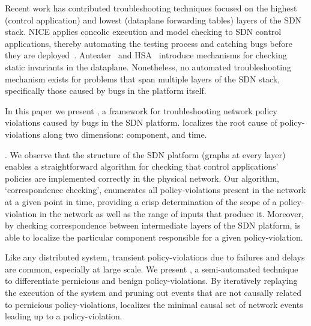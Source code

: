 Recent work has contributed troubleshooting techniques focused on the highest (control
application) and lowest (dataplane forwarding tables) layers of the SDN stack.
NICE applies concolic execution and model checking to SDN control
applications, thereby automating the testing process and catching bugs before
they are deployed~\cite{nice}. Anteater~\cite{anteater} and HSA~\cite{hsa}
introduce mechanisms for checking static invariants in the dataplane.
Nonetheless, no automated troubleshooting mechanism exists for problems that span
multiple layers of the SDN stack, specifically those caused by bugs in the platform
itself.


In this paper we present \projectname{}, a framework for troubleshooting
network policy violations caused by bugs in the
SDN platform. \projectname{} localizes the root cause
of policy-violations along two dimensions:
component, and time.

. We observe that the structure of the
SDN platform (graphs at every layer) enables a straightforward algorithm for
checking that control applications' policies are implemented correctly in
the physical network. Our algorithm, `correspondence checking',
enumerates all policy-violations present in the network at a given point in
time, providing a crisp determination of the scope of a policy-violation in the
network as well as the range of inputs that produce it. Moreover,
by checking correspondence between intermediate layers of the
SDN platform, \projectname{} is able to localize the particular component responsible 
for a given policy-violation.


 Like any distributed
system, transient policy-violations due to failures and delays are 
common, especially at large scale. We present \simulator{}, a semi-automated
technique to differentiate pernicious and benign policy-violations.
By iteratively replaying the execution of
the system and pruning out events that are not causally related to pernicious
policy-violations, \simulator{} localizes the minimal causal set of network events
leading up to a policy-violation. 

